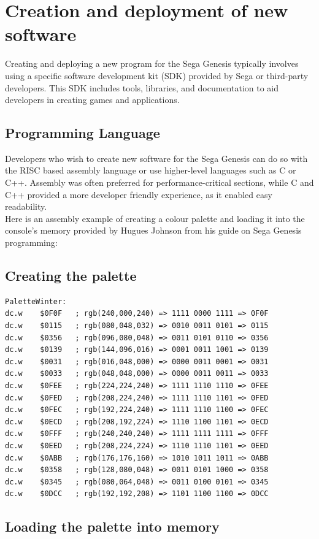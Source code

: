 \documentclass[12pt]{article}
\begin{document}
\section{Creation and deployment of new software}
Creating and deploying a new program for the Sega Genesis typically involves using a specific software development kit (SDK) provided by Sega or third-party developers. This SDK includes tools, libraries, and documentation to aid developers in creating games and applications.

\subsection*{Programming Language} 
Developers who wish to create new software for the Sega Genesis can do so with the RISC based assembly language or use higher-level languages such as C or C++. Assembly was often preferred for performance-critical sections, while C and C++ provided a more developer friendly experience, as it enabled easy readability.
\\
\newpage
Here is an assembly example of creating a colour palette and loading it into the console's memory provided by Hugues Johnson from his guide on Sega Genesis programming:

\subsection*{Creating the palette}
\begin{lstlisting}
PaletteWinter:
dc.w	$0F0F	; rgb(240,000,240) => 1111 0000 1111 => 0F0F
dc.w	$0115	; rgb(080,048,032) => 0010 0011 0101 => 0115
dc.w	$0356	; rgb(096,080,048) => 0011 0101 0110 => 0356
dc.w	$0139	; rgb(144,096,016) => 0001 0011 1001 => 0139
dc.w	$0031	; rgb(016,048,000) => 0000 0011 0001 => 0031
dc.w	$0033	; rgb(048,048,000) => 0000 0011 0011 => 0033
dc.w	$0FEE	; rgb(224,224,240) => 1111 1110 1110 => 0FEE
dc.w	$0FED	; rgb(208,224,240) => 1111 1110 1101 => 0FED
dc.w	$0FEC	; rgb(192,224,240) => 1111 1110 1100 => 0FEC
dc.w	$0ECD	; rgb(208,192,224) => 1110 1100 1101 => 0ECD
dc.w	$0FFF	; rgb(240,240,240) => 1111 1111 1111 => 0FFF
dc.w	$0EED	; rgb(208,224,224) => 1110 1110 1101 => 0EED
dc.w	$0ABB	; rgb(176,176,160) => 1010 1011 1011 => 0ABB
dc.w	$0358	; rgb(128,080,048) => 0011 0101 1000 => 0358
dc.w	$0345	; rgb(080,064,048) => 0011 0100 0101 => 0345
dc.w	$0DCC	; rgb(192,192,208) => 1101 1100 1100 => 0DCC
\end{lstlisting}
\newpage
\subsection*{Loading the palette into memory}
\end{document}

